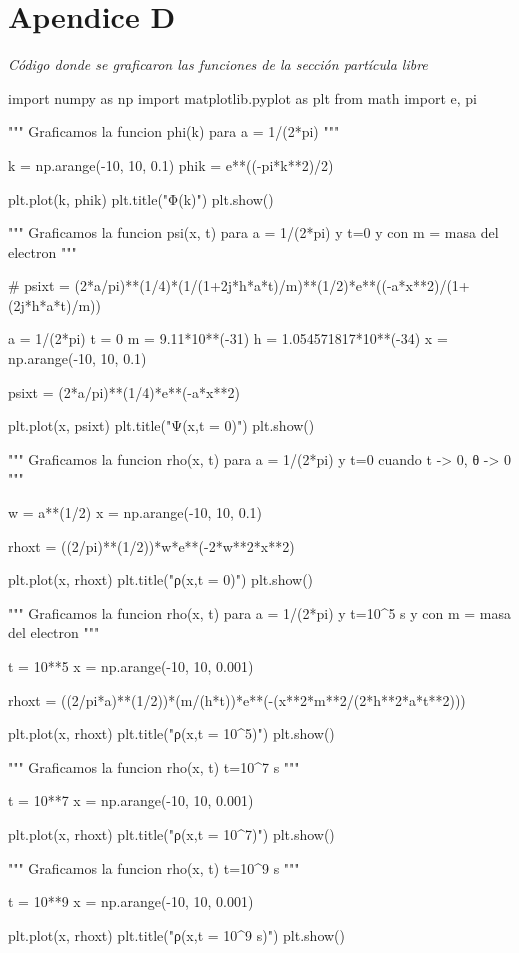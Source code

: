\section*{Apendice D}
\label{ApendiceD}

\emph{Código donde se graficaron las funciones de la sección partícula libre}

\begin{python}
    import numpy as np
    import matplotlib.pyplot as plt
    from math import e, pi 
    
    """
    Graficamos la funcion phi(k) para a = 1/(2*pi)
    """
    
    k = np.arange(-10, 10, 0.1)
    phik = e**((-pi*k**2)/2)
    
    plt.plot(k, phik)
    plt.title("Φ(k)")
    plt.show()
    
    """
    Graficamos la funcion psi(x, t) para a = 1/(2*pi) y t=0 y con m = masa del electron
    """

    # psixt = (2*a/pi)**(1/4)*(1/(1+2j*h*a*t)/m)**(1/2)*e**((-a*x**2)/(1+(2j*h*a*t)/m))
    
    
    a = 1/(2*pi)
    t = 0
    m = 9.11*10**(-31)
    h = 1.054571817*10**(-34) 
    x = np.arange(-10, 10, 0.1)
    
    psixt = (2*a/pi)**(1/4)*e**(-a*x**2)
    
    plt.plot(x, psixt)
    plt.title("Ψ(x,t = 0)")
    plt.show()
    
    """
    Graficamos la funcion rho(x, t) para a = 1/(2*pi) y t=0
    cuando t -> 0, θ -> 0
    """
    
    w = a**(1/2)
    x = np.arange(-10, 10, 0.1)
    
    rhoxt = ((2/pi)**(1/2))*w*e**(-2*w**2*x**2)
    
    plt.plot(x, rhoxt)
    plt.title("ρ(x,t = 0)")
    plt.show()
    
    
    """
    Graficamos la funcion rho(x, t) para a = 1/(2*pi) y t=10^5 s y con m = masa del electron
    """
    
    t = 10**5
    x = np.arange(-10, 10, 0.001)
    
    rhoxt = ((2/pi*a)**(1/2))*(m/(h*t))*e**(-(x**2*m**2/(2*h**2*a*t**2)))
    
    
    plt.plot(x, rhoxt)
    plt.title("ρ(x,t = 10^5)")
    plt.show()
    
    
    """
    Graficamos la funcion rho(x, t) t=10^7 s
    """
    
    t = 10**7
    x = np.arange(-10, 10, 0.001)
    
    plt.plot(x, rhoxt)
    plt.title("ρ(x,t = 10^7)")
    plt.show()
    
    
    """
    Graficamos la funcion rho(x, t) t=10^9 s
    """
    
    t = 10**9
    x = np.arange(-10, 10, 0.001)
    
    plt.plot(x, rhoxt)
    plt.title("ρ(x,t = 10^9 s)")
    plt.show()
\end{python}
